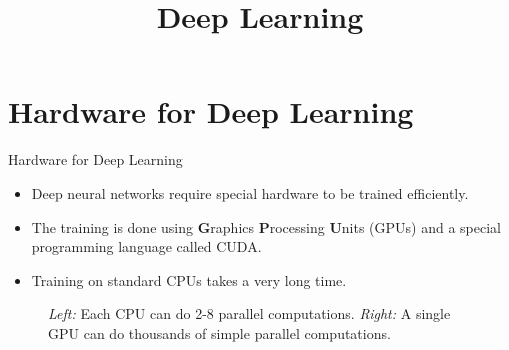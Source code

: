 





\newcommand{\titlefigure}{figure/software_cover.png}
\newcommand{\learninggoals}{
  \item GPU training for accelerated learning
  \item Software for hardware support
  \item Deep learning software platforms
}

\title{Deep Learning}
\date{}




\section{Hardware for Deep Learning}
\begin{frame} {Hardware for Deep Learning}
  \begin{itemize}
    \item Deep neural networks require special hardware to be trained efficiently.
    \item The training is done using \textbf{G}raphics \textbf{P}rocessing \textbf{U}nits (GPUs) and a special programming language called CUDA.
    \item Training on standard CPUs takes a very long time.
  \end{itemize}
\begin{figure}
    \centering
      \caption{\textit{Left:} Each CPU can do 2-8 parallel computations. \textit{Right:} A single GPU can do thousands of simple parallel computations.}
  \end{figure}
\end{frame}

